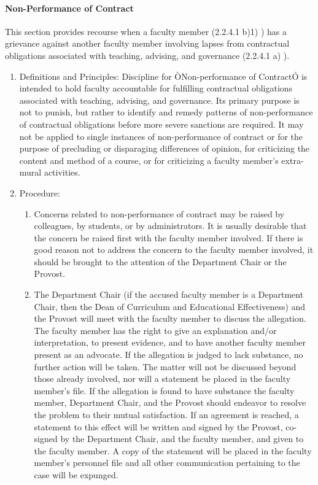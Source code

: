 \documentclass[letterpaper, 11pt]{article}
\begin{document}
			\paragraph{Non-Performance of Contract}
				This section provides recourse when a faculty member (2.2.4.1 b)1) ) has a grievance against another faculty member involving lapses from contractual obligations associated with teaching, advising, and governance (2.2.4.1 a) ).
				\begin{enumerate}[label=\alph*)]
					\item{Definitions and Principles:}
					Discipline for ÒNon-performance of ContractÓ is intended to hold faculty accountable for fulfilling contractual obligations associated with teaching, advising, and governance.  Its primary purpose is not to punish, but rather to identify and remedy patterns of non-performance of contractual obligations before more severe sanctions are required.
					It may not be applied to single instances of non-performance of contract or for the purpose of precluding or disparaging differences of opinion, for criticizing the content and method of a course, or for criticizing a faculty member's extra-mural activities.
					\item{Procedure:
						\begin{enumerate}[label=\arabic*)]
							\item{Concerns related to non-performance of contract may be raised by colleagues, by students, or by administrators.  It is usually desirable that the concern be raised first with the faculty member involved.  If there is good reason not to address the concern to the faculty member involved, it should be brought to the attention of the Department Chair or the Provost.}
							\item{The Department Chair (if the accused faculty member is a Department Chair, then the Dean of Curriculum and Educational Effectiveness) and the Provost will meet with the faculty member to discuss the allegation.  The faculty member has the right to give an explanation and/or interpretation, to present evidence, and to have another faculty member present as an advocate.  If the allegation is judged to lack substance, no further action will be taken.  The matter will not be discussed beyond those already involved, nor will a statement be placed in the faculty member's file.  If the allegation is found to have substance the faculty member, Department Chair, and the Provost should endeavor to resolve the problem to their mutual satisfaction.  If an agreement is reached, a statement to this effect will be written and signed by the Provost, co-signed by the Department Chair, and the faculty member, and given to the faculty member.  A copy of the statement will be placed in the faculty member's personnel file and all other communication pertaining to the case will be expunged.}

\end{enumerate}}
\end{enumerate}
\end{document}
